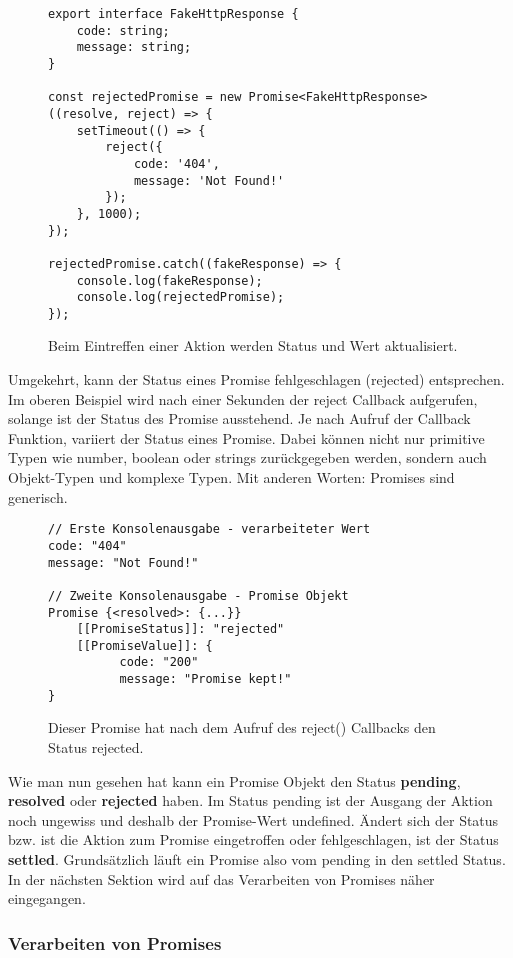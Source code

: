 \begin{figure}[H]
\begin{lstlisting}[basicstyle=\small]
export interface FakeHttpResponse {
    code: string;
    message: string;
}

const rejectedPromise = new Promise<FakeHttpResponse>((resolve, reject) => {
    setTimeout(() => {
        reject({
            code: '404',
            message: 'Not Found!'
        });
    }, 1000);
});

rejectedPromise.catch((fakeResponse) => {
    console.log(fakeResponse);
    console.log(rejectedPromise);
});
\end{lstlisting}
\caption{Beim Eintreffen einer Aktion werden Status und Wert aktualisiert.}
\end{figure}

\noindent
Umgekehrt, kann der Status eines Promise fehlgeschlagen (rejected) entsprechen. Im oberen Beispiel wird nach einer Sekunden der reject Callback aufgerufen, solange ist der Status des Promise ausstehend. Je nach Aufruf der Callback Funktion, variiert der Status eines Promise. Dabei können nicht nur primitive Typen wie number, boolean oder strings zurückgegeben werden, sondern auch Objekt-Typen und komplexe Typen. Mit anderen Worten: Promises sind generisch.

\begin{figure}[H]
\begin{lstlisting}
// Erste Konsolenausgabe - verarbeiteter Wert
code: "404"
message: "Not Found!"
    
// Zweite Konsolenausgabe - Promise Objekt
Promise {<resolved>: {...}}
    [[PromiseStatus]]: "rejected"
    [[PromiseValue]]: {
          code: "200"
          message: "Promise kept!"
}
\end{lstlisting}
\caption{Dieser Promise hat nach dem Aufruf des reject() Callbacks den Status rejected.}
\end{figure}

\noindent
Wie man nun gesehen hat kann ein Promise Objekt den Status \textbf{pending}, \textbf{resolved} oder \textbf{rejected} haben. Im Status pending ist der Ausgang der Aktion noch ungewiss und deshalb der Promise-Wert undefined. Ändert sich der Status bzw. ist die Aktion zum Promise eingetroffen oder fehlgeschlagen, ist der Status \textbf{settled}. Grundsätzlich läuft ein Promise also vom pending in den settled Status. In der nächsten Sektion wird auf das Verarbeiten von Promises näher eingegangen.

\subsubsection{Verarbeiten von Promises}

